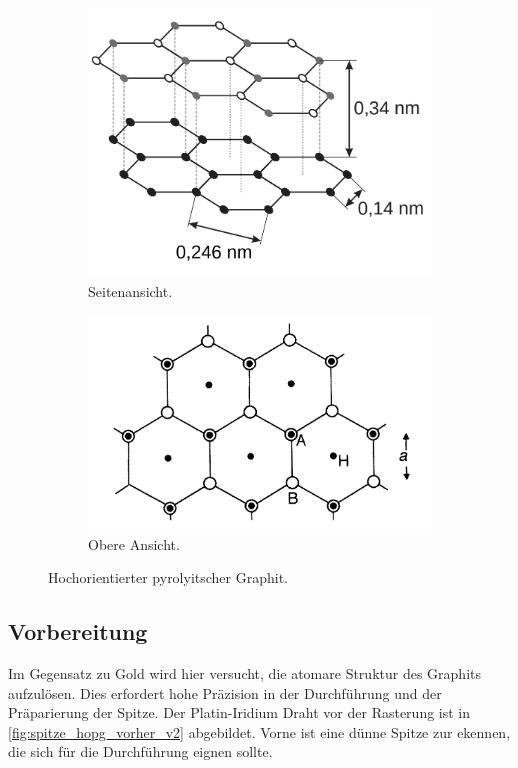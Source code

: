 \begin{figure}[htb]
	\centering
	\begin{subfigure}{0.45\linewidth}
		\includegraphics[width=\linewidth]{figs/hopg1.png}
		\caption{Seitenansicht.\cite[S.49]{skript}}
		\label{fig:hopg1}
	\end{subfigure}
	\hspace{0.5cm}
	\begin{subfigure}{0.45\linewidth}
		\includegraphics[width=\linewidth]{figs/hopg2.png}
		\caption{Obere Ansicht.\cite[Kap.1 S.17]{rtm-leitpfaden}}
		\label{fig:hopg2}
	\end{subfigure}
	\caption{Hochorientierter pyrolyitscher Graphit.}
	\label{fig:hopg-skizze}
\end{figure}

\subsection*{Vorbereitung}
Im Gegensatz zu Gold wird hier versucht, die atomare Struktur des Graphits aufzulösen.
Dies erfordert hohe Präzision in der Durchführung und der Präparierung der Spitze. Der Platin-Iridium Draht
vor der Rasterung ist in \cref{fig:spitze_hopg_vorher_v2} abgebildet. Vorne ist eine dünne Spitze zur ekennen,
die sich für die Durchführung eignen sollte.

